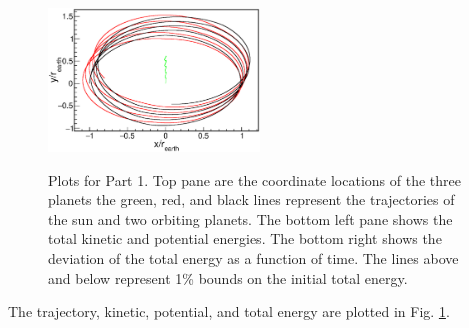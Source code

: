 \documentclass[singlepage,notitlepage,nofootinbib,11pt]{revtex4-1}
\begin{document}
\begin{figure}[h]
  \centering
  \includegraphics[width=0.5\textwidth]{figures/1r.eps}
  \\
\hfill
  \caption{\label{fig1} Plots for Part 1. Top pane are the coordinate locations of the three planets the green, red, and black lines represent the trajectories of the sun and two orbiting planets. The bottom left pane shows the total kinetic and potential energies. The bottom right shows the deviation of the total energy as a function of time. The lines above and below represent 1\% bounds on the initial total energy.}
\end{figure}
The trajectory, kinetic, potential, and total energy are plotted in Fig. \ref{fig1}.
\clearpage
\end{document}
